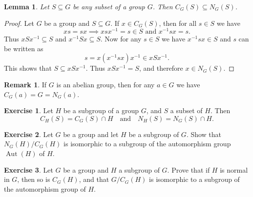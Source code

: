 \documentclass[12pt]{report}
\newtheorem{lemma}[theorem]{Lemma}
\numberwithin{equation}{section}
\numberwithin{theorem}{chapter}
\theoremstyle{definition}
\newtheorem{exercise}{Exercise}
\newtheorem*{basic properties}{Basic Properties}
\newtheorem*{Important Remark}{Important Remark}
\newtheorem{remark}[theorem]{Remark}
\DeclareMathOperator{\Aut}{Aut}
\DeclareMathOperator{\Orb}{Orb}
\DeclareMathOperator{\Stab}{Stab}
\begin{document}
\begin{lemma}
	Let $S \subseteq G$ be any subset of a group $G$. Then $C_G(S) \subseteq N_G(S)$.
\end{lemma}

\begin{proof}
	Let $G$ be a group and $S \subseteq G$. If $x \in C_G(S)$, then for all $s \in S$ we have
	$$xs=sx \implies xsx^{-1} = s \in S \textrm{ and } x^{-1}sx = s.$$
	Thus $xSx^{-1} \subseteq S$ and $x^{-1}Sx \subseteq S$.
	Now for any $s \in S$ we have $x^{-1}sx \in S$ and $s$ can be written as 
	$$s = x(x^{-1}sx)x^{-1} \in xSx^{-1}.$$ 
	This shows that $S \subseteq xSx^{-1}$. Thus $xSx^{-1} = S$, and therefore $x \in N_G(S)$.
\end{proof}

\begin{remark}
	If $G$ is an abelian group, then for any $a \in G$ we have $C_G(a) = G = N_G(a)$.
\end{remark}


\begin{exercise}\label{centralizer and normalizer in subgroup}
	Let $H$ be a subgroup of a group $G$, and $S$ a subset of $H$. Then 
	$$C_{H}(S) = C_G(S) \cap H \quad \textrm{and} \quad N_{H}(S) = N_G(S) \cap H.$$
\end{exercise}




\begin{exercise}
Let $G$ be a group and let $H$ be a subgroup of $G$. 
Show that $N_G(H)/C_G(H)$ is isomorphic to a subgroup of the automorphism group $\Aut(H)$ of $H$.
\end{exercise}


\begin{exercise}
Let $G$ be a group and $H$ a subgroup of $G$. Prove that if $H$ is normal in $G$, then so is $C_G(H)$, and that $G/C_G(H)$ is isomorphic to a subgroup of the automorphism group of $H$.
\end{exercise}

%
%
\end{document}
